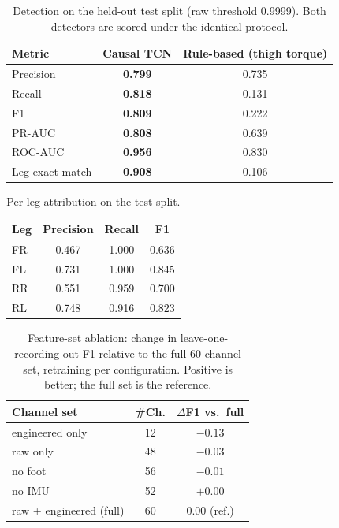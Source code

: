 \begin{table}[t]
\centering
\caption{Detection on the held-out test split (raw threshold 0.9999). Both detectors are scored
under the identical protocol.}
\label{tab:detection}
\footnotesize
\begin{tabular}{@{}lcc@{}}
\toprule
Metric & Causal TCN & Rule-based (thigh torque) \\
\midrule
Precision       & \textbf{0.799} & 0.735 \\
Recall          & \textbf{0.818} & 0.131 \\
F1              & \textbf{0.809} & 0.222 \\
PR-AUC          & \textbf{0.808} & 0.639 \\
ROC-AUC         & \textbf{0.956} & 0.830 \\
Leg exact-match & \textbf{0.908} & 0.106 \\
\bottomrule
\end{tabular}
\end{table}

\begin{table}[t]
\centering
\caption{Per-leg attribution on the test split.}
\label{tab:perleg}
\footnotesize
\begin{tabular}{@{}lccc@{}}
\toprule
Leg & Precision & Recall & F1 \\
\midrule
FR & 0.467 & 1.000 & 0.636 \\
FL & 0.731 & 1.000 & 0.845 \\
RR & 0.551 & 0.959 & 0.700 \\
RL & 0.748 & 0.916 & 0.823 \\
\bottomrule
\end{tabular}
\end{table}

\begin{table}[t]
\centering
\caption{Feature-set ablation: change in leave-one-recording-out F1 relative to the full
60-channel set, retraining per configuration. Positive is better; the full set is the reference.}
\label{tab:ablation}
\footnotesize
\begin{tabular}{@{}lcc@{}}
\toprule
Channel set & \#Ch. & $\Delta$F1 vs.\ full \\
\midrule
engineered only & 12 & $-0.13$ \\
raw only        & 48 & $-0.03$ \\
no foot         & 56 & $-0.01$ \\
no IMU          & 52 & $+0.00$ \\
raw + engineered (full) & 60 & $0.00$ (ref.) \\
\bottomrule
\end{tabular}
\end{table}

